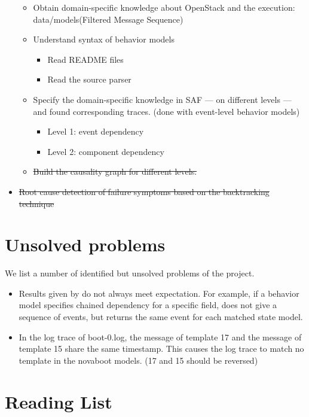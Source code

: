 \documentclass{article}
\begin{document}
\begin{itemize}
\begin{itemize}
  \item Obtain domain-specific knowledge about OpenStack and the execution:
    data/models(Filtered Message Sequence)
  \item Understand syntax of \saf{} behavior models
    \begin{itemize}
    \item Read README files
    \item Read the source parser
    \end{itemize}
  \item Specify the domain-specific knowledge in SAF --- on different levels ---
    and found corresponding traces. (done with event-level behavior models)
    \begin{itemize}
    \item Level 1: event dependency
    \item Level 2: component dependency
    \end{itemize}
  \item \sout{Build the causality graph for different levels.}
  \end{itemize}
\item \sout{Root cause detection of failure symptoms based on the backtracking technique}
\end{itemize}

\section{Unsolved problems}
\label{sec:usp}

We list a number of identified but unsolved problems of the project.

\begin{itemize}
\item Results given by \saf{} do not always meet expectation. For example, if a
behavior model specifies chained dependency for a specific field, \saf{} does
not give a sequence of events, but returns the same event for each matched state
model.

\item In the log trace of boot-0.log, the message of template 17 and the message
  of template 15 share the same timestamp. This causes the log trace to match no
  template in the novaboot models. (17 and 15 should be reversed)

\end{itemize}

\section{Reading List}
\label{sec:read}
\end{document}
